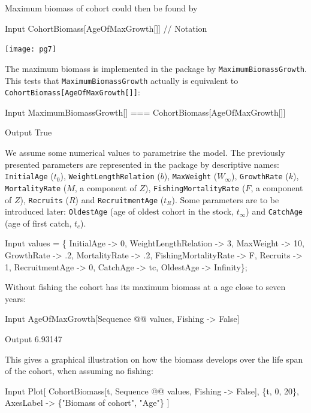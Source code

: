 \documentclass[11pt,fleqn]{book} %
\begin{document}
\begin{theorem}
\begin{flushleft}
Maximum biomass of cohort could then be found by
\begin{mmaCell}{Input}
  CohortBiomass[AgeOfMaxGrowth[]] // Notation
\end{mmaCell}
\texttt{[image: pg7]}

The maximum biomass is implemented in the package by \texttt{MaximumBiomassGrowth}. This tests that \texttt{MaximumBiomassGrowth} actually is equivalent to \texttt{CohortBiomass[AgeOfMaxGrowth[]]}:
\begin{mmaCell}{Input}
  MaximumBiomassGrowth[] === CohortBiomass[AgeOfMaxGrowth[]]
\end{mmaCell}
\begin{mmaCell}{Output}
  True
\end{mmaCell}
We assume some numerical values to parametrise the model. The previously presented parameters are represented in the package by descriptive names: \texttt{InitialAge} ($t_0$), \texttt{WeightLengthRelation} ($b$), \texttt{MaxWeight} ($W_\infty$), \texttt{GrowthRate} ($k$), \texttt{MortalityRate} ($M$, a component of $Z$), \texttt{FishingMortalityRate} ($F$, a component of $Z$), \texttt{Recruits} ($R$) and \texttt{RecruitmentAge} ($t_R$). Some parameters are to be introduced later: \texttt{OldestAge} (age of oldest cohort in the stock, $t_\infty$) and \texttt{CatchAge} (age of first catch, $t_c$).
\begin{mmaCell}{Input}
  values = \{
    InitialAge           -> 0, 
    WeightLengthRelation -> 3, 
    MaxWeight            -> 10, 
    GrowthRate           -> .2, 
    MortalityRate        -> .2,
    FishingMortalityRate -> F, 
    Recruits             -> 1, 
    RecruitmentAge       -> 0, 
    CatchAge             -> tc, 
    OldestAge            -> Infinity\};
\end{mmaCell}
Without fishing the cohort has its maximum biomass at a age close to seven years:
\begin{mmaCell}{Input}
  AgeOfMaxGrowth[Sequence @@ values, Fishing -> False]
\end{mmaCell}
\begin{mmaCell}{Output}
  6.93147
\end{mmaCell}
This gives a graphical illustration on how the biomass develops over the life span of the cohort, when assuming no fishing:
\begin{mmaCell}{Input}
  Plot[
    CohortBiomass[t, Sequence @@ values, Fishing -> False],
    \{t, 0, 20\}, 
    AxesLabel -> \{"Biomass of cohort", "Age"\}
  ]
\end{mmaCell}

\end{flushleft}
\end{theorem}
\end{document}
